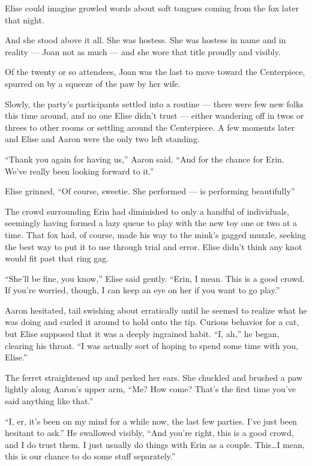 Elise could imagine growled words about soft tongues coming from the fox later that night.

And she stood above it all. She was hostess. She was hostess in name and in reality --- Joan not as much --- and she wore that title proudly and visibly.

Of the twenty or so attendees, Joan was the last to move toward the Centerpiece, spurred on by a squeeze of the paw by her wife.

Slowly, the party's participants settled into a routine --- there were few new folks this time around, and no one Elise didn't trust --- either wandering off in twos or threes to other rooms or settling around the Centerpiece. A few moments later and Elise and Aaron were the only two left standing.

``Thank you again for having us,'' Aaron said. ``And for the chance for Erin. We've really been looking forward to it.''

Elise grinned, ``Of course, sweetie. She performed --- is performing beautifully''

The crowd surrounding Erin had diminished to only a handful of individuals, seemingly having formed a lazy queue to play with the new toy one or two at a time. That fox had, of course, made his way to the mink's gagged muzzle, seeking the best way to put it to use through trial and error. Elise didn't think any knot would fit past that ring gag.

``She'll be fine, you know,'' Elise said gently. ``Erin, I mean. This is a good crowd. If you're worried, though, I can keep an eye on her if you want to go play.''

Aaron hesitated, tail swishing about erratically until he seemed to realize what he was doing and curled it around to hold onto the tip. Curious behavior for a cat, but Elise supposed that it was a deeply ingrained habit. ``I, ah,'' he began, clearing his throat. ``I was actually sort of hoping to spend some time with you, Elise.''

The ferret straightened up and perked her ears. She chuckled and brushed a paw lightly along Aaron's upper arm, ``Me? How come? That's the first time you've said anything like that.''

``I, er, it's been on my mind for a while now, the last few parties. I've just been hesitant to ask.'' He swallowed visibly, ``And you're right, this is a good crowd, and I do trust them. I just usually do things with Erin as a couple. This\ldots{}I mean, this is our chance to do some stuff separately.''

